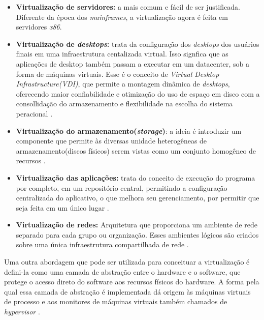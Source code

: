 \begin{itemize}
\item \textbf{Virtualização de servidores:} a mais comum e fácil de ser justificada. Diferente da época dos \textit{mainframes}, a virtualização agora é feita em servidores \textit{x86}.

\item \textbf{Virtualização de \textit{desktops}:} trata da configuração dos \textit{desktops} dos usuários finais em uma infraestrutura centalizada virtual. Isso signfica que as aplicações de desktop também passam a executar em um datacenter, sob a forma de máquinas virtuais. Esse é o conceito de \textit{Virtual Desktop Infrastructure(VDI)}, que permite a montagem dinâmica de \textit{desktops}, oferecendo maior confiabilidade e otimização do uso de espaço em disco com a consollidação do armazenamento e flexibilidade na escolha do sistema peracional \cite{manoel}.

\item \textbf{Virtualização do armazenamento(\textit{storage})}: a ideia é introduzir um componente que permite às diversas unidade heterogêneas de armazenamento(discos físicos) serem vistas como um conjunto homogêneo de recursos \cite{manoel}.

\item \textbf{Virtualização das aplicações:} trata do conceito de execução do programa por completo, em um repositório central, permitindo a configuração centralizada do aplicativo, o que melhora seu gerenciamento, por permitir que seja feita em um único lugar \cite{manoel}. 

\item \textbf{Virtualização de redes: } Arquitetura que proporciona um ambiente de rede separado para cada grupo ou organização. Esses ambientes lógicos são criados sobre uma única infraestrutura compartilhada de rede \cite{manoel}.

\end{itemize}

Uma outra abordagem que pode ser utilizada para conceituar a virtualização é defini-la como uma camada de abstração entre o hardware e o software, que protege o acesso direto do software aos recursos físicos do hardware. A forma pela qual essa camada de abstração é implementada dá origem às máquinas virtuais de processo e aos monitores de máquinas virtuais também chamados de \textit{hypervisor} \cite{manoel}.

